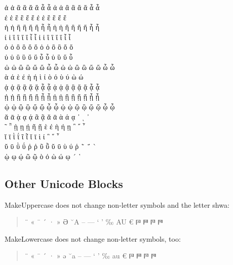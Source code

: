 \documentclass[a4paper]{article}
\begin{document}
{%
\MakeLowercase{ ἀ ἁ ἂ ἃ ἄ ἅ ἆ ἇ Ἀ Ἁ Ἂ Ἃ Ἄ Ἅ Ἆ Ἇ }\\
\MakeLowercase{ ἐ ἑ ἒ ἓ ἔ ἕ     Ἐ Ἑ Ἒ Ἓ Ἔ Ἕ     }\\
\MakeLowercase{ ἠ ἡ ἢ ἣ ἤ ἥ ἦ ἧ Ἠ Ἡ Ἢ Ἣ Ἤ Ἥ Ἦ Ἧ }\\
\MakeLowercase{ ἰ ἱ ἲ ἳ ἴ ἵ ἶ ἷ Ἰ Ἱ Ἲ Ἳ Ἴ Ἵ Ἶ Ἷ }\\
\MakeLowercase{ ὀ ὁ ὂ ὃ ὄ ὅ     Ὀ Ὁ Ὂ Ὃ Ὄ Ὅ     }\\
\MakeLowercase{ ὐ ὑ ὒ ὓ ὔ ὕ ὖ ὗ   Ὑ   Ὓ   Ὕ   Ὗ }\\
\MakeLowercase{ ὠ ὡ ὢ ὣ ὤ ὥ ὦ ὧ Ὠ Ὡ Ὢ Ὣ Ὤ Ὥ Ὦ Ὧ }\\
\MakeLowercase{ ὰ ά ὲ έ ὴ ή ὶ ί ὸ ό ὺ ύ ὼ ώ     }\\
\MakeLowercase{ ᾀ ᾁ ᾂ ᾃ ᾄ ᾅ ᾆ ᾇ ᾈ ᾉ ᾊ ᾋ ᾌ ᾍ ᾎ ᾏ }\\
\MakeLowercase{ ᾐ ᾑ ᾒ ᾓ ᾔ ᾕ ᾖ ᾗ ᾘ ᾙ ᾚ ᾛ ᾜ ᾝ ᾞ ᾟ }\\
\MakeLowercase{ ᾠ ᾡ ᾢ ᾣ ᾤ ᾥ ᾦ ᾧ ᾨ ᾩ ᾪ ᾫ ᾬ ᾭ ᾮ ᾯ }\\
\MakeLowercase{ ᾰ ᾱ ᾲ ᾳ ᾴ   ᾶ ᾷ Ᾰ Ᾱ Ὰ Ά ᾼ ᾽ ι ᾿ }\\
\MakeLowercase{ ῀ ῁ ῂ ῃ ῄ   ῆ ῇ Ὲ Έ Ὴ Ή ῌ ῍ ῎ ῏ }\\
\MakeLowercase{ ῐ ῑ ῒ ΐ     ῖ ῗ Ῐ Ῑ Ὶ Ί   ῝ ῞ ῟ }\\
\MakeLowercase{ ῠ ῡ ῢ ΰ ῤ ῥ ῦ ῧ Ῠ Ῡ Ὺ Ύ Ῥ ῭ ΅ ` }\\
\MakeLowercase{     ῲ ῳ ῴ   ῶ ῷ Ὸ Ό Ὼ Ώ ῼ ´ ῾   }

\subsection{Other Unicode Blocks}

MakeUppercase does not change non-letter symbols and the letter shwa:
\begin{quote}
  \greekscript
  \MakeUppercase{¨ « ¯ ´ · »}
  \MakeUppercase{ə}
  \MakeUppercase{˘a}
  \MakeUppercase{– — ‘ ’ ‰ a‌u}
  \MakeUppercase{€}
  \MakeUppercase{
  𐅄 %
  𐅅 %
  𐅆 %
  𐅇 %
  }
\end{quote}
MakeLowercase does not change non-letter symbols, too:
\begin{quote}
  \greekscript
  \MakeLowercase{¨ « ¯ ´ · »}
  \MakeLowercase{ə}
  \MakeLowercase{˘A}
  \MakeLowercase{– — ‘ ’ ‰ A‌‌U}
  \MakeLowercase{€}
  \MakeLowercase{
  𐅄 %
  𐅅 %
  𐅆 %
  𐅇 %
  }
\end{quote}

}
\end{document}
